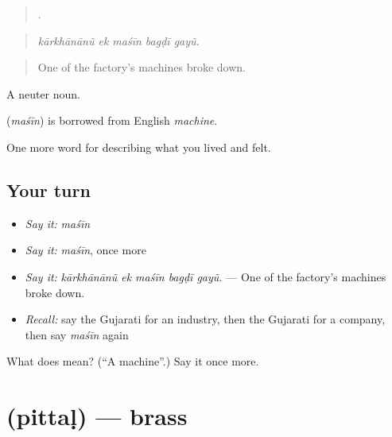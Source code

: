 \begin{quote}
    .
\end{quote}

\begin{quote}
\emph{kārkhānānũ ek maśīn bagḍī gayũ.}
\end{quote}

\begin{quote}
One of the factory's machines broke down.
\end{quote}

A neuter noun.

\begin{cousinweb}
\textbf{} (\emph{maśīn}) is borrowed from English \emph{machine}.
\end{cousinweb}

\begin{grammarlens}[title={What you've built}]
One more word for describing what you lived and felt.
\end{grammarlens}

\subsection*{Your turn}
\begin{itemize}
\raggedright
  \item \emph{Say it:} \emph{maśīn}
  \item \emph{Say it:} \emph{maśīn}, once more
  \item \emph{Say it:} \emph{kārkhānānũ ek maśīn bagḍī gayũ.} — One of the factory's machines broke down.
  \item \emph{Recall:} say the Gujarati for an industry, then the Gujarati for a company, then say \emph{maśīn} again
\end{itemize}

\begin{tcolorbox}[breakable,colback=teal!4,colframe=teal!35!black,title={Before you move on}]
What does  mean? (\textquotedblleft{}A machine\textquotedblright{}.) Say it once more.
\end{tcolorbox}
\section[\texorpdfstring{\gu{પિત્તળ} (pittaḷ)}{પિત્તળ (pittaḷ)}]{ (pittaḷ) — brass}

\label{lesson:GU-C513-pittal}



